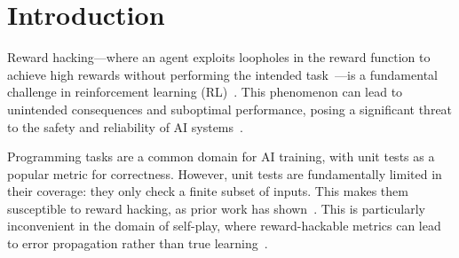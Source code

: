 \section{Introduction}
\label{intro}

Reward hacking---where
an agent exploits loopholes in the reward function to achieve high rewards
without performing the intended task~\cite{rewardhacking}---is a fundamental challenge in reinforcement learning (RL)~\cite{baker2025monitoringreasoningmodelsmisbehavior}. 
This phenomenon can lead to unintended consequences and suboptimal performance, posing a significant
threat to the safety and reliability of AI systems~\cite{anthropicrh}. 

Programming tasks are a common domain for AI training,
with unit tests as a popular metric for correctness. 
However, unit tests are fundamentally limited in their coverage: 
they only check a finite subset of inputs. 
This makes them susceptible to reward hacking, as prior work has shown~\cite{liu_2023}\cite{xin_2017}\cite{yuan2024manualtestsevaluatingimproving}.
This is particularly inconvenient in the domain of self-play,
where reward-hackable metrics can lead to error propagation rather than true learning~\cite{lin2026learningsolveverifyselfplay}.



